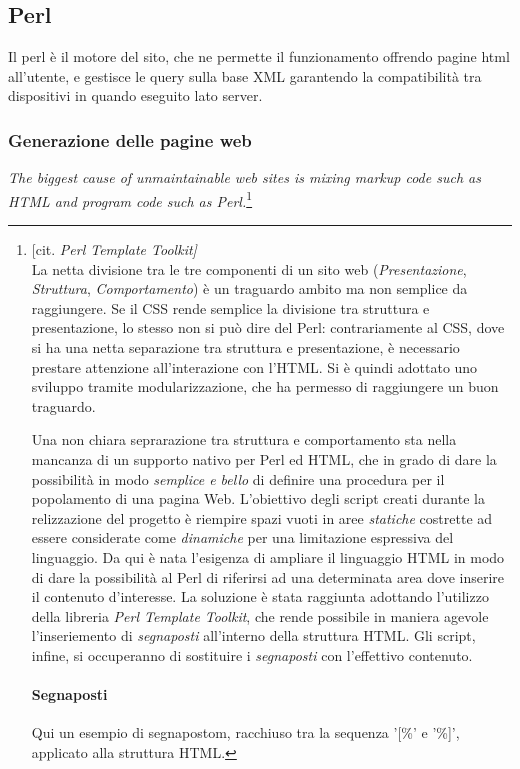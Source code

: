 \subsection{Perl}
Il perl \`e il motore del sito, che ne permette il funzionamento offrendo pagine html all'utente, e gestisce le query sulla base XML garantendo la compatibilit\`a tra dispositivi in quando eseguito lato server.
\subsubsection{Generazione delle pagine web}
\textit{The biggest cause of unmaintainable web sites is mixing markup code such as HTML and program code such as Perl.}\footnote{[cit. \textit{Perl Template Toolkit]}\\

La netta divisione tra le tre componenti di un sito web (\textit{Presentazione}, \textit{Struttura}, \textit{Comportamento}) \`e un traguardo ambito ma non semplice da raggiungere. Se il CSS rende semplice la divisione tra struttura e presentazione, lo stesso non si pu\`o dire del Perl: contrariamente al CSS, dove si ha una netta separazione tra struttura e presentazione, \`e necessario prestare attenzione all'interazione con l'HTML. Si \`e quindi adottato uno sviluppo tramite modularizzazione, che ha permesso di raggiungere un buon traguardo.

Una non chiara seprarazione tra struttura e comportamento sta nella mancanza di un supporto nativo per Perl ed HTML, che in grado di dare la possibilit\`a in modo \textit{semplice e bello} di definire una procedura per il popolamento di una pagina Web. L'obiettivo degli script creati durante la relizzazione del progetto \`e riempire spazi vuoti in aree \textit{statiche} costrette ad essere considerate come \textit{dinamiche} per una limitazione espressiva del linguaggio. Da qui \`e nata l'esigenza di ampliare il linguaggio HTML in modo di dare la possibilit\`a al Perl di riferirsi ad una determinata area dove inserire il contenuto d'interesse. La soluzione \`e stata raggiunta adottando l'utilizzo della libreria \textit{Perl Template Toolkit}, che rende possibile in maniera agevole l'inseriemento di \textit{segnaposti} all'interno della struttura HTML. Gli script, infine, si occuperanno di sostituire i \textit{segnaposti} con l'effettivo contenuto.
\paragraph*{Segnaposti} Qui un esempio di segnapostom, racchiuso tra la sequenza '[\%' e '\%]', applicato alla struttura HTML. 


}
